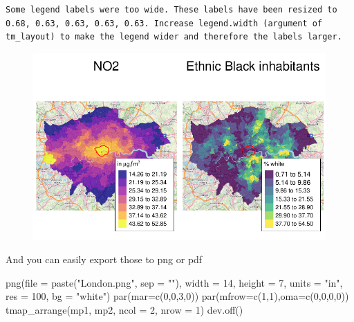 \documentclass[
  letterpaper,
]{scrbook}
\newenvironment{Shaded}{\begin{snugshade}}{\end{snugshade}}
\newcommand{\AttributeTok}[1]{\textcolor[rgb]{0.40,0.45,0.13}{#1}}
\newcommand{\DecValTok}[1]{\textcolor[rgb]{0.68,0.00,0.00}{#1}}
\newcommand{\FunctionTok}[1]{\textcolor[rgb]{0.28,0.35,0.67}{#1}}
\newcommand{\NormalTok}[1]{\textcolor[rgb]{0.00,0.23,0.31}{#1}}
\newcommand{\StringTok}[1]{\textcolor[rgb]{0.13,0.47,0.30}{#1}}
\begin{document}
\begin{verbatim}
Some legend labels were too wide. These labels have been resized to 0.68, 0.63, 0.63, 0.63, 0.63. Increase legend.width (argument of tm_layout) to make the legend wider and therefore the labels larger.
\end{verbatim}

\begin{figure}[H]

{\centering \includegraphics{02_spatial-data_files/figure-pdf/unnamed-chunk-20-1.pdf}

}

\end{figure}

And you can easily export those to png or pdf

\begin{Shaded}
\begin{Highlighting}[]
\FunctionTok{png}\NormalTok{(}\AttributeTok{file =} \FunctionTok{paste}\NormalTok{(}\StringTok{"London.png"}\NormalTok{, }\AttributeTok{sep =} \StringTok{""}\NormalTok{), }\AttributeTok{width =} \DecValTok{14}\NormalTok{, }\AttributeTok{height =} \DecValTok{7}\NormalTok{, }\AttributeTok{units =} \StringTok{"in"}\NormalTok{, }
    \AttributeTok{res =} \DecValTok{100}\NormalTok{, }\AttributeTok{bg =} \StringTok{"white"}\NormalTok{)}
\FunctionTok{par}\NormalTok{(}\AttributeTok{mar=}\FunctionTok{c}\NormalTok{(}\DecValTok{0}\NormalTok{,}\DecValTok{0}\NormalTok{,}\DecValTok{3}\NormalTok{,}\DecValTok{0}\NormalTok{))}
\FunctionTok{par}\NormalTok{(}\AttributeTok{mfrow=}\FunctionTok{c}\NormalTok{(}\DecValTok{1}\NormalTok{,}\DecValTok{1}\NormalTok{),}\AttributeTok{oma=}\FunctionTok{c}\NormalTok{(}\DecValTok{0}\NormalTok{,}\DecValTok{0}\NormalTok{,}\DecValTok{0}\NormalTok{,}\DecValTok{0}\NormalTok{))}
\FunctionTok{tmap\_arrange}\NormalTok{(mp1, mp2, }\AttributeTok{ncol =} \DecValTok{2}\NormalTok{, }\AttributeTok{nrow =} \DecValTok{1}\NormalTok{)}
\FunctionTok{dev.off}\NormalTok{()}
\end{Highlighting}
\end{Shaded}
\end{document}
